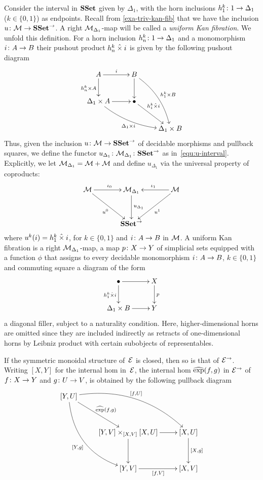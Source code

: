 \documentclass[reqno,10pt,a4paper,oneside]{amsart}
\begin{document}
\begin{example} Consider the interval in $\SSet$ given by $\Delta_1$, with the horn inclusions 
$h^k_1 \co 1 \to \Delta_1$ ($k \in \{ 0, 1 \}$) as endpoints. Recall from \cref{exa-triv-kan-fib} that we
have the inclusion $u \co \cal{M} \to \SSet^\to$. A right $\cal{M}_{\Delta_1}$-map will be called
a \emph{uniform Kan fibration}. We unfold this definition. For a horn inclusion $h^{k}_n \co 1 \to \Delta_1$ and  a monomorphism $i \co A \to B$ their pushout product $h^k_n \hattimes i$ is given by the following pushout diagram
\[
\xymatrix{
 A \ar[r]^{i}  \ar[d]_{h^k_n \times A} &  B \ar@/^1em/[ddr]^{h^k_1 \times B} \ar[d] & \\ 
\Delta_1 \times A \ar@/_1em/[drr]_{\Delta_1 \times i} \ar[r] & \bullet \ar[dr]^-(.35){h^k_1 \hattimes i}  & \\ 
 & & \Delta_1 \times B} 
 \]
 Thus, given the inclusion $u \co \cal{M} \to \SSet^\to$ of decidable morphisms and pullback squares, 
 we define the functor $u_{\Delta_1} \co \cal{M}_{\Delta_1} \co \SSet^\to$ as in~\eqref{equ:u-interval}. 
 Explicitly, we let $\cal{M}_{\Delta_1} = \cal{M} + \cal{M}$ and define $u_{\Delta_1}$ via the universal
 property of coproducts:
  \[
 \xymatrix@R=1.2cm@C=1.2cm{
 \cal{M} \ar[dr]_{u^0}  \ar[r]^{\iota_0} &  \cal{M}_{\Delta_1} \ar[d]^{u_{\Delta_1}} & \cal{M} \ar[dl]^{u^1} \ar[l]_{\iota_1} \\
  & \SSet^\to & }
  \]
  where $u^k(i) = h^k_1 \hattimes i$,   for $k \in \{ 0, 1 \}$ and $i \co A \to B$ in $\cal{M}$. 
A  uniform Kan fibration is a right $\cal{M}_{\Delta_1}$-map, \ie 
a map  $p \co X \to Y$ of simplicial sets equipped with a function $\phi$ that assigns
to every decidable monomorphism $i \co A \to B$, $k \in \{0, 1\}$  and commuting
square a diagram of the form
\[
\xymatrix{
\bullet \ar[r] \ar[d]_{h^k_1 \hattimes i} & X \ar[d]^p \\
\Delta_1 \times B \ar[r] & Y }
\]
a diagonal filler, subject to a naturality condition.  Here, higher-dimensional horns are omitted since they are included indirectly as retracts of one-dimensional horns by Leibniz product with certain subobjects of representables.
 \end{example} 
  
  \begin{remark}  If the symmetric
monoidal structure of~$\catE$ is closed, then so is that of $\catE^\to$. Writing $[X,Y]$ for the internal hom in~$\catE$,
the internal hom $\hatexp(f,g)$ in $\catE^\to$ of $f \co X \to Y$ and $g \co U \to V$, is obtained by the following 
pullback diagram
\[
\xymatrix@R=1.2cm{
[Y, U] \ar@/^2pc/[drr]^{[f,U]} \ar@/_2pc/[ddr]_{[Y,g]}  \ar[dr]^{\hatexp(f,g)} & & \\ 
 & [Y,V] \times_{[X,V]} [X,U]  \ar[d] \ar[r] & [X,U] \ar[d]^{[X,g]} \\
 & [Y,V] \ar[r]_{[f,V]} & [X,V] }
 \]
 \end{remark}
\end{document}
